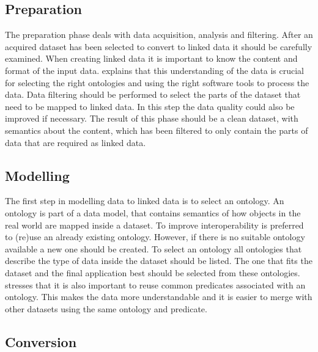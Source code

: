 \subsection{Preparation}
The preparation phase deals with data acquisition, analysis and filtering. After an acquired dataset has been selected to convert to linked data it should be carefully examined. When creating linked data it is important to know the content and format of the input data. \cite{LD:Missier} explains that this understanding of the data is crucial for selecting the right ontologies and using the right software tools to process the data. Data filtering should be performed to select the parts of the dataset that need to be mapped to linked data. In this step the data quality could also be improved if necessary. The result of this phase should be a clean dataset, with semantics about the content, which has been filtered to only contain the parts of data that are required as linked data. 
 
\subsection{Modelling}
The first step in modelling data to linked data is to select an ontology. An ontology is part of a data model, that contains semantics of how objects in the real world are mapped inside a dataset. To improve interoperability is preferred to (re)use an already existing ontology. However, if there is no suitable ontology available a new one should be created. To select an ontology all ontologies that describe the type of data inside the dataset should be listed. The one that fits the dataset and the final application best should be selected from these ontologies. \cite{LD:Missier} stresses that it is also important to reuse common predicates associated with an ontology. This makes the data more understandable and it is easier to merge with other datasets using the same ontology and predicate. 

 
\subsection{Conversion}


